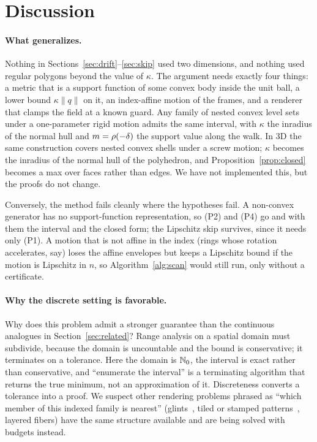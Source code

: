 \section{Discussion}
\label{sec:discussion}

\paragraph{What generalizes.}
Nothing in Sections~\ref{sec:drift}--\ref{sec:skip} used two dimensions, and
nothing used regular polygons beyond the value of $\kappa$. The argument needs
exactly four things: a metric that is a support function of some convex body
inside the unit ball, a lower bound $\kappa\lVert q\rVert$ on it, an index-affine
motion of the frames, and a renderer that clamps the field at a known guard. Any
family of nested convex level sets under a one-parameter rigid motion admits the
same interval, with $\kappa$ the inradius of the normal hull and
$m=\rho(-\delta)$ the support value along the walk. In $3$D the same construction
covers nested convex shells under a screw motion; $\kappa$ becomes the inradius of
the normal hull of the polyhedron, and Proposition~\ref{prop:closed} becomes a max
over faces rather than edges. We have not implemented this, but the proofs do not
change.

Conversely, the method fails cleanly where the hypotheses fail. A non-convex
generator has no support-function representation, so (P2) and (P4) go and with them
the interval and the closed form; the Lipschitz skip survives, since it needs only
(P1). A motion that is not affine in the index (rings whose rotation
accelerates, say) loses the affine envelopes but keeps a Lipschitz bound if the
motion is Lipschitz in $n$, so Algorithm~\ref{alg:scan} would still run, only
without a certificate.

\paragraph{Why the discrete setting is favorable.}
Why does this problem admit a stronger guarantee than the
continuous analogues in Section~\ref{sec:related}? Range analysis on a spatial
domain must subdivide, because the domain is uncountable and the bound is
conservative; it terminates on a tolerance. Here the domain is $\mathbb{N}_0$, the interval
is exact rather than conservative, and ``enumerate the interval'' is a terminating
algorithm that returns the true minimum, not an approximation of it. Discreteness
converts a tolerance into a proof. We suspect other rendering problems phrased as
``which member of this indexed family is nearest'' (glints~\cite{Yan2014,
Yan2016}, tiled or stamped patterns~\cite{Lagae2010}, layered fibers) have the
same structure available and are being solved with budgets instead.

